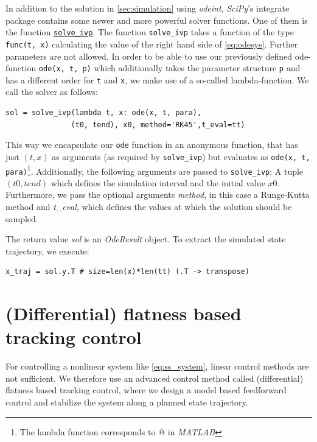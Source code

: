 \documentclass[a4paper,11pt,headings=standardclasses,parskip=half]{scrartcl}
\newcommand{\scipy}{\emph{SciPy}\xspace}
\begin{document}
In addition to the solution in \autoref{sec:simulation} using \emph{odeint}, \scipy's integrate package contains some newer and more powerful solver functions. One of them is the function \href{https://docs.scipy.org/doc/scipy/reference/generated/scipy.integrate.solve_ivp.html}{\texttt{solve\_ivp}}. The function \texttt{solve\_ivp} takes a function of the type \texttt{func(t, x)} calculating the value of the right hand side of \eqref{eq:odesys}. Further parameters are not allowed. In order to be able to use our previously defined ode-function \texttt{ode(x, t, p)} which additionally takes the parameter structure \texttt{p} and has a different order for \texttt{t}  and \texttt{x}, we make use of a so-called lambda-function. We call the solver as follows:
\begin{lstlisting}
sol = solve_ivp(lambda t, x: ode(x, t, para), 
               (t0, tend), x0, method='RK45',t_eval=tt)
\end{lstlisting}
This way we encapsulate our \texttt{ode} function in an anonymous function, that has just $(t, x)$ as arguments (as required by \texttt{solve\_ivp}) but evaluates as \texttt{ode(x, t, para)}\footnote{The lambda function corresponds to @ in \emph{MATLAB}}. Additionally, the following arguments are passed to \texttt{solve\_ivp}: A tuple $(t0, tend)$ which defines the simulation interval and the initial value $x0$. Furthermore, we pass the optional arguments \emph{method}, in this case a Runge-Kutta method and \emph{t\_eval}, which defines the values at which the solution should be sampled.

The return value \emph{sol} is an \emph{OdeResult} object. To extract the simulated state trajectory, we execute:
\begin{lstlisting}
x_traj = sol.y.T # size=len(x)*len(tt) (.T -> transpose)
\end{lstlisting}



\section{(Differential) flatness based tracking control}
For controlling a nonlinear system like \eqref{eq:ss_system}, linear control methods are not sufficient. We therefore use an advanced control method called (differential) flatness based tracking control, where we design a model based feedforward control and stabilize the system along a planned state trajectory.
\end{document}
